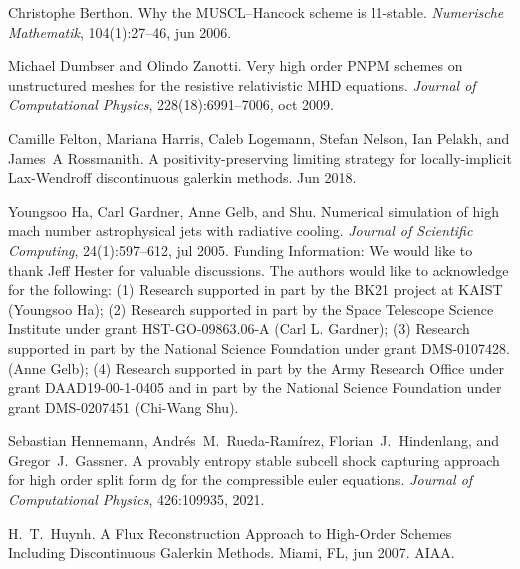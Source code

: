 \documentclass{beamer}
\newcommand{\tmtextit}[1]{{\itshape{#1}}}
\begin{document}
{{\begin{frame}
  \begin{thebibliography}{10}
    Christophe Berthon. {\newblock}Why the
    MUSCL--Hancock scheme is l1-stable. {\newblock}\tmtextit{Numerische
    Mathematik}, 104(1):27--46, jun 2006.{\newblock}
    
    Michael Dumbser  and  Olindo Zanotti.
    {\newblock}Very high order PNPM schemes on unstructured meshes for the
    resistive relativistic MHD equations. {\newblock}\tmtextit{Journal of
    Computational Physics}, 228(18):6991--7006, oct 2009.{\newblock}
    
    Camille Felton, Mariana Harris, Caleb Logemann,
    Stefan Nelson, Ian Pelakh, and  James~A Rossmanith. {\newblock}A
    positivity-preserving limiting strategy for locally-implicit Lax-Wendroff
    discontinuous galerkin methods. {\newblock}Jun 2018.{\newblock}
    
    Youngsoo Ha, Carl Gardner,
    Anne Gelb, and {} Shu. {\newblock}Numerical simulation
    of high mach number astrophysical jets with radiative cooling.
    {\newblock}\tmtextit{Journal of Scientific Computing}, 24(1):597--612, jul
    2005. {\newblock}Funding Information: We would like to thank Jeff Hester
    for valuable discussions. The authors would like to acknowledge for the
    following: (1) Research supported in part by the BK21 project at KAIST
    (Youngsoo Ha); (2) Research supported in part by the Space Telescope
    Science Institute under grant HST-GO-09863.06-A (Carl L. Gardner); (3)
    Research supported in part by the National Science Foundation under grant
    DMS-0107428. (Anne Gelb); (4) Research supported in part by the Army
    Research Office under grant DAAD19-00-1-0405 and in part by the National
    Science Foundation under grant DMS-0207451 (Chi-Wang Shu).{\newblock}
    
    Sebastian Hennemann,
    Andr{\'e}s~M.~Rueda-Ram{\'i}rez, Florian~J.~Hindenlang, and 
    Gregor~J.~Gassner. {\newblock}A provably entropy stable subcell shock
    capturing approach for high order split form dg for the compressible euler
    equations. {\newblock}\tmtextit{Journal of Computational Physics},
    426:109935, 2021.{\newblock}
    
    H.~T.~Huynh. {\newblock}A Flux Reconstruction
    Approach to High-Order Schemes Including Discontinuous Galerkin Methods.
    {\newblock}Miami, FL, jun 2007. AIAA.{\newblock}
    

\end{thebibliography}
\end{frame}}}
\end{document}
